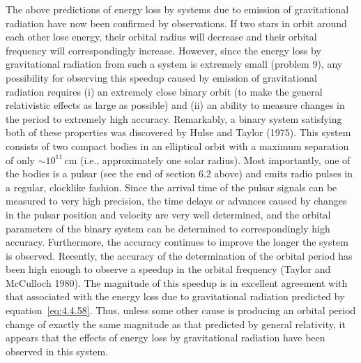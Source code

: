 The above predictions of energy loss by systems due to emission of gravitational
radiation have now been confirmed by observations. If two stars in orbit around
each other lose energy, their orbital radius will decrease and their orbital frequency
will correspondingly increase. However, since the energy loss by gravitational
radiation from such a system is extremely small (problem 9), any possibility for
observing this speedup caused by emission of gravitational radiation requires (i) an
extremely close binary orbit (to make the general relativistic effects as large as
possible) and (ii) an ability to measure changes in the period to extremely high
accuracy. Remarkably, a binary system satisfying both of these properties was
discovered by Hulse and Taylor (1975). This system consists of two compact bodies
in an elliptical orbit with a maximum separation of only \(\sim10^{11}\,\mathrm{cm}\)
(i.e., approximately one solar radius). Most importantly, one of the bodies is a
pulsar (see the end of section 6.2 above) and emits radio pulses in a regular,
clocklike fashion. Since the arrival time of the pulsar signals can be measured to
very high precision, the time delays or advances caused by changes in the pulsar
position and velocity are very well determined, and the orbital parameters of the
binary system can be determined to correspondingly high accuracy. Furthermore,
the accuracy continues to improve the longer the system is observed. Recently, the
accuracy of the determination of the orbital period has been high enough to observe
a speedup in the orbital frequency (Taylor and McCulloch 1980). The magnitude of
this speedup is in excellent agreement with that associated with the energy loss due
to gravitational radiation predicted by equation~\eqref{eq:4.4.58}. Thus, unless
some other cause is producing an orbital period change of exactly the same
magnitude as that predicted by general relativity, it appears that the effects of
energy loss by gravitational radiation have been observed in this system.
